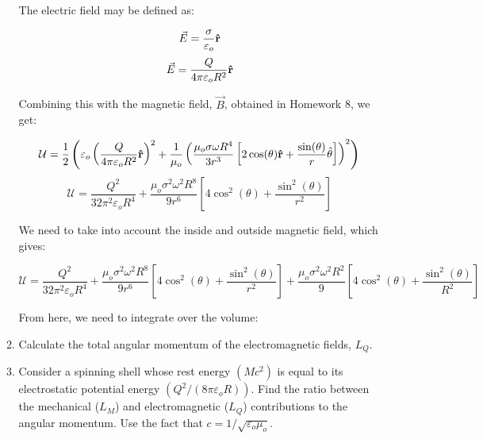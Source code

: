 \begin{enumerate}
\begin{enumerate}
        The electric field may be defined as:

        $$\vec{E}=\frac{\sigma}{\varepsilon_o}\bold{\hat{r}}$$
        $$\vec{E}=\frac{Q}{4\pi\varepsilon_o R^2}\bold{\hat{r}}$$

        Combining this with the magnetic field, $\vec{B}$, obtained in Homework 8, we get:

        $$\mathcal{U}=\frac{1}{2}\left( \varepsilon_o\left( \frac{Q}{4\pi\varepsilon_o R^2} \bold{\hat{r}}\right)^2+\frac{1}{\mu_o}\left( \frac{\mu_o\sigma\omega R^4}{3r^3}\left[2\cos(\theta)\bold{\hat{r}}+\frac{\sin(\theta)}{r}\hat{\theta}\right]  \right)^2 \right)$$
        $$\mathcal{U}=\frac{Q^2}{32\pi^2\varepsilon_o R^4}+\frac{\mu_o\sigma^2\omega^2 R^8}{9r^6}\left[4\cos^2(\theta)+\frac{\sin^2(\theta)}{r^2}\right]$$

        We need to take into account the inside and outside magnetic field, which gives:

        $$\mathcal{U}=\frac{Q^2}{32\pi^2\varepsilon_o R^4}+\frac{\mu_o\sigma^2\omega^2 R^8}{9r^6}\left[4\cos^2(\theta)+\frac{\sin^2(\theta)}{r^2}\right]+\frac{\mu_o\sigma^2\omega^2 R^2}{9}\left[4\cos^2(\theta)+\frac{\sin^2(\theta)}{R^2}\right]$$

        From here, we need to integrate over the volume:

      \item Calculate the total angular momentum of the electromagnetic fields, $L_Q$.

      \item Consider a spinning shell whose rest energy $(Mc^2)$ is equal to its electrostatic potential energy $(Q^2/(8\pi\varepsilon_o R))$. Find the ratio between the mechanical ($L_M$) and electromagnetic ($L_Q$) contributions to the angular momentum. Use the fact that $c=1/\sqrt{\varepsilon_o\mu_o}$.

    \end{enumerate}

\end{enumerate}



